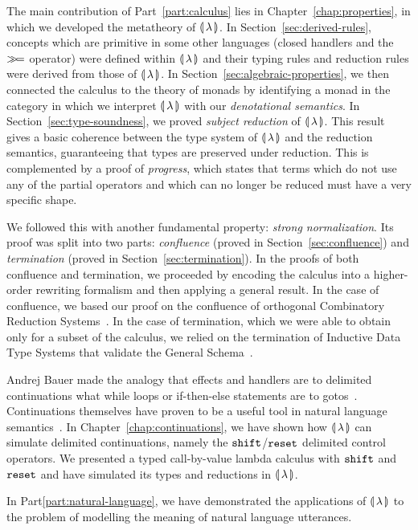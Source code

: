 The main contribution of Part~\ref{part:calculus} lies in
Chapter~\ref{chap:properties}, in which we developed the metatheory of
${\llparenthesis \, \lambda \, \rrparenthesis}$. In Section~\ref{sec:derived-rules}, concepts which are primitive
in some other languages (closed handlers and the $\mathbin{\gg\!=}$ operator) were
defined within ${\llparenthesis \, \lambda \, \rrparenthesis}$ and their typing rules and reduction rules were
derived from those of ${\llparenthesis \, \lambda \, \rrparenthesis}$. In Section~\ref{sec:algebraic-properties},
we then connected the calculus to the theory of monads by identifying a
monad in the category in which we interpret ${\llparenthesis \, \lambda \, \rrparenthesis}$ with our
\emph{denotational semantics}. In Section~\ref{sec:type-soundness}, we
proved \emph{subject reduction} of ${\llparenthesis \, \lambda \, \rrparenthesis}$. This result gives a basic
coherence between the type system of ${\llparenthesis \, \lambda \, \rrparenthesis}$ and the reduction semantics,
guaranteeing that types are preserved under reduction. This is complemented
by a proof of \emph{progress}, which states that terms which do not use any
of the partial operators and which can no longer be reduced must have a
very specific shape.

We followed this with another fundamental property: \emph{strong
  normalization}. Its proof was split into two parts: \emph{confluence}
(proved in Section~\ref{sec:confluence}) and \emph{termination} (proved in
Section~\ref{sec:termination}). In the proofs of both confluence and
termination, we proceeded by encoding the calculus into a higher-order
rewriting formalism and then applying a general result. In the case of
confluence, we based our proof on the confluence of orthogonal Combinatory
Reduction Systems~\cite{klop1993combinatory}. In the case of termination,
which we were able to obtain only for a subset of the calculus, we relied
on the termination of Inductive Data Type Systems that validate the General
Schema~\cite{blanqui2002inductive}.

Andrej Bauer made the analogy that effects and handlers are to delimited
continuations what while loops or if-then-else statements are to
gotos~\cite{bauer2012lambda}. Continuations themselves have proven to be a
useful tool in natural language
semantics~\cite{de2001type,barker2002continuations,shan2005linguistic,de2006towards,barker2006continuations,barker2014continuations}. In
Chapter~\ref{chap:continuations}, we have shown how ${\llparenthesis \, \lambda \, \rrparenthesis}$ can simulate
delimited continuations, namely the $\mathtt{shift}$/$\mathtt{reset}$ delimited control
operators. We presented a typed call-by-value lambda calculus with $\mathtt{shift}$
and $\mathtt{reset}$ and have simulated its types and reductions in ${\llparenthesis \, \lambda \, \rrparenthesis}$.

In Part\ref{part:natural-language}, we have demonstrated the applications
of ${\llparenthesis \, \lambda \, \rrparenthesis}$ to the problem of modelling the meaning of natural language
utterances.

